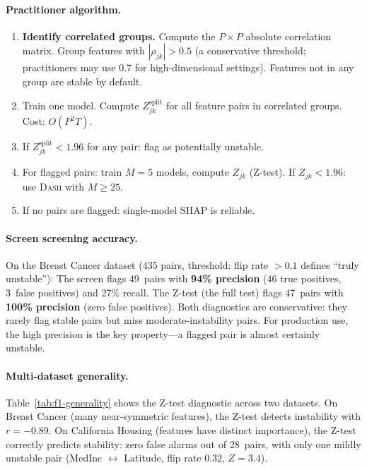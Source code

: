 \documentclass{article}
\newcommand{\DASH}{\textsc{Dash}}
\begin{document}
\paragraph{Practitioner algorithm.}
\begin{enumerate}
    \item[\textbf{Step 0.}] \textbf{Identify correlated groups.}
          Compute the $P \times P$ absolute correlation matrix.
          Group features with $|\rho_{jk}| > 0.5$ (a conservative
          threshold; practitioners may use $0.7$ for high-dimensional
          settings). Features not in any group are stable by default.
    \item[\textbf{Step 1.}] Train one model. Compute $Z^{\text{split}}_{jk}$ for all
          feature pairs in correlated groups. Cost: $O(P^2 T)$.
    \item[\textbf{Step 2.}] If $Z^{\text{split}}_{jk} < 1.96$ for any pair: flag as
          potentially unstable.
    \item[\textbf{Step 3.}] For flagged pairs: train $M = 5$ models, compute $Z_{jk}$
          (Z-test). If $Z_{jk} < 1.96$: use \DASH{} with $M \geq 25$.
    \item[\textbf{Step 4.}] If no pairs are flagged: single-model SHAP is reliable.
\end{enumerate}

\paragraph{Screen screening accuracy.}
On the Breast Cancer dataset (435 pairs, threshold: flip rate $> 0.1$
defines ``truly unstable''):
The screen flags 49~pairs with \textbf{94\% precision} (46 true positives,
3~false positives) and 27\% recall.
The Z-test (the full test) flags 47~pairs with \textbf{100\% precision}
(zero false positives).
Both diagnostics are conservative: they rarely flag stable pairs but
miss moderate-instability pairs. For production use, the high precision
is the key property---a flagged pair is almost certainly unstable.

\paragraph{Multi-dataset generality.}
Table~\ref{tab:f1-generality} shows the Z-test diagnostic across two datasets.
On Breast Cancer (many near-symmetric features), the Z-test detects instability
with $r = -0.89$. On California Housing (features have distinct importance),
the Z-test correctly predicts stability: zero false alarms out of 28~pairs,
with only one mildly unstable pair (MedInc $\leftrightarrow$ Latitude,
flip rate $0.32$, $Z = 3.4$).
\end{document}
